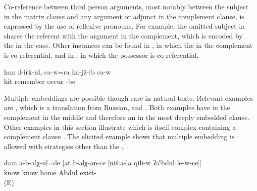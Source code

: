 Co-reference between third person arguments, most notably between the subject in the matrix clause and any argument or adjunct in the complement clause, is expressed by the use of reflexive pronouns. For example, the omitted subject in  shares the referent with the  argument in the complement, which is encoded by the  in the  case. Other instances can be found in , in which the  in the complement is co-referential, and in , in which the possessor is co-referential.
%
\begin{exe}
	\ex	\label{ex:He is sitting and remembering how (they) beat him up}
	\gll	[cini-j	d-aˁq-ib-te=ra]	han	d-irk-ul,	ca-w=ra	ka-jž-ib	ca-w\\
		 hit	remember	occur		-be	\\
	\glt	{}
\end{exe}

Multiple embeddings are possible though rare in natural texts. Relevant examples are , which is a translation from Russian, and . Both examples have  in the complement in the middle and therefore an  in the most deeply embedded clause. Other examples in this section illustrate  which is itself complex containing a complement clause . The elicited example  shows that multiple embedding is allowed with  strategies other than the .
%
\begin{exe}
	\ex	\label{ex:‎‎‎I did not know that you know that Abdul was at our place}
	\gll	dam	a-b-alχ-ul=de	[at	b-alχ-an-ce	[nišːa-la	qili-w	ʡaˁbdul	le-w-ce]]\\
			know		know		home	Abdul	exist-\\
	\glt	{} (E)
\end{exe}

